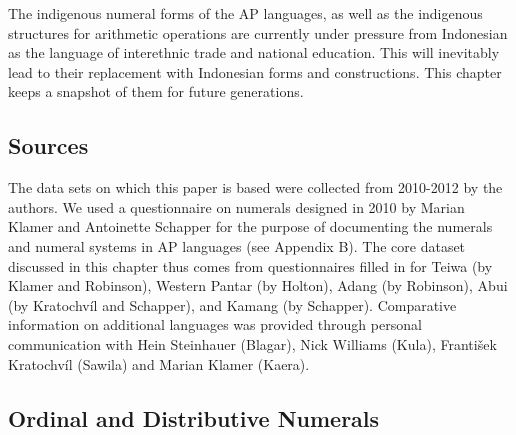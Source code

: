 The indigenous numeral forms of the AP languages, as well as the indigenous structures for arithmetic operations are currently under pressure from Indonesian as the language of interethnic trade and national education. This will inevitably lead to their replacement with Indonesian forms and constructions. This chapter keeps a snapshot of them for future generations. 

\subsection{Sources}
\label{sec:8:Sources}
The data sets on which this paper is based were collected from 2010-2012 by the authors. We used a questionnaire on numerals designed in 2010 by Marian Klamer and Antoinette Schapper for the purpose of documenting the numerals and numeral systems in AP languages (see Appendix B). The core dataset discussed in this chapter thus comes from questionnaires filled in for Teiwa (by Klamer and Robinson), Western Pantar (by Holton), Adang (by Robinson), Abui (by Kratochv\'il and Schapper), and Kamang (by Schapper). Comparative information on additional languages was provided through personal communication with Hein Steinhauer (Blagar), Nick Williams (Kula), Franti{\v{s}}ek Kratochv\'il (Sawila) and Marian Klamer (Kaera).

\clearpage
\startappendix
\subsection{Ordinal and Distributive Numerals} 

